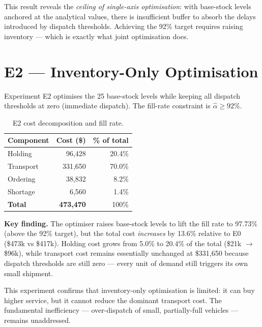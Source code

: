 This result reveals the \emph{ceiling of single-axis optimisation}: with
base-stock levels anchored at the analytical values, there is insufficient
buffer to absorb the delays introduced by dispatch thresholds.  Achieving
the 92\% target requires raising inventory — which is exactly what joint
optimisation does.

\section{E2 --- Inventory-Only Optimisation}
\label{sec:results:e2}

Experiment E2 optimises the 25 base-stock levels while keeping all
dispatch thresholds at zero (immediate dispatch).  The fill-rate
constraint is $\hat{\alpha} \geq 92\%$.

\begin{table}[htbp]
  \centering
  \caption{E2 cost decomposition and fill rate.}
  \label{tab:e2}
  \begin{tabular}{@{}lrr@{}}
    \toprule
    Component & Cost (\$) & \% of total \\
    \midrule
    Holding    &  96,428 & 20.4\% \\
    Transport  & 331,650 & 70.0\% \\
    Ordering   &  38,832 &  8.2\% \\
    Shortage   &   6,560 &  1.4\% \\
    \midrule
    \textbf{Total} & \textbf{473,470} & 100\% \\
    \bottomrule
  \end{tabular}
\end{table}

\textbf{Key finding.}  The optimiser raises base-stock levels to lift
the fill rate to 97.73\% (above the 92\% target), but the total cost
\emph{increases} by 13.6\% relative to E0 (\$473k vs \$417k).  Holding
cost grows from 5.0\% to 20.4\% of the total (\$21k $\to$ \$96k), while
transport cost remains essentially unchanged at \$331,650 because
dispatch thresholds are still zero — every unit of demand still triggers
its own small shipment.

This experiment confirms that inventory-only optimisation is limited:
it can buy higher service, but it cannot reduce the dominant transport
cost.  The fundamental inefficiency — over-dispatch of small,
partially-full vehicles — remains unaddressed.

